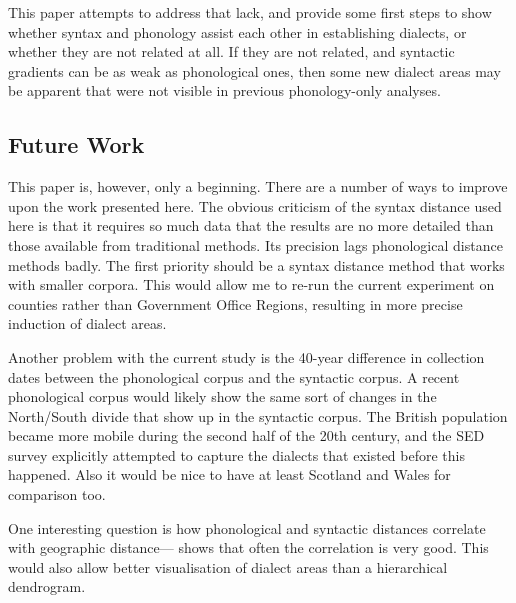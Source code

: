 \documentclass[11pt]{article}
\begin{document}
This paper attempts to address that lack, and provide some first steps
to show whether syntax and phonology assist each other in establishing
dialects, or whether they are not related at all. If they are not
related, and syntactic gradients can be as weak as phonological ones,
then some new dialect areas may be apparent that were not visible in
previous phonology-only analyses.

\subsection{Future Work}

This paper is, however, only a beginning. There are a number of ways to
improve upon the work presented here. The obvious criticism of the
syntax distance used here is that it requires so much data that the
results are no more detailed than those available from traditional
methods. Its precision lags phonological distance methods badly. The
first priority should be a syntax distance method that works with
smaller corpora. This would allow me to re-run the current experiment
on counties rather than Government Office Regions, resulting in more
precise induction of dialect areas.

Another problem with the current study is the 40-year difference in
collection dates between the phonological corpus and the syntactic
corpus. A recent phonological corpus would likely show the same sort
of changes in the North/South divide that show up in the syntactic
corpus. The British population became more mobile during the second
half of the 20th century, and the SED survey explicitly attempted to capture
the dialects that existed before this happened. Also it would be nice to have at
least Scotland and Wales for comparison too.

One interesting question is
how phonological and syntactic distances correlate with geographic
distance--- shows that often the correlation is
very good. This would also allow better visualisation of dialect areas
than a hierarchical dendrogram.


\end{document}
